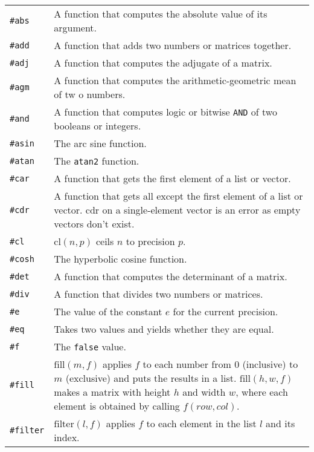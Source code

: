 \documentclass[10pt]{article}
\begin{document}
    \begin{longtable}{p{}p{}}
        \verb|#abs|     & A function that computes the absolute value of its argument. \\
        \verb|#add|     & A function that adds two numbers or matrices together. \\
        \verb|#adj|     & A function that computes the adjugate of a matrix. \\
        \verb|#agm|     & A function that computes the arithmetic-geometric mean of tw o numbers. \\
        \verb|#and|     & A function that computes logic or bitwise \verb|AND| of two booleans or integers. \\
        \verb|#asin|    & The arc sine function. \\
        \verb|#atan|    & The \verb|atan2| function. \\
        \verb|#car|     & A function that gets the first element of a list or vector. \\
        \verb|#cdr|     & A function that gets all except the first element of a list or vector.
                          $ \mathrm{cdr} $ on a single-element vector is an error as empty vectors don't exist. \\
        \verb|#cl|      & $ \mathrm{cl}(n,p) $ ceils $ n $ to precision $ p $. \\
        \verb|#cosh|    & The hyperbolic cosine function. \\
        \verb|#det|     & A function that computes the determinant of a matrix. \\
        \verb|#div|     & A function that divides two numbers or matrices. \\
        \verb|#e|       & The value of the constant $ e $ for the current precision. \\
        \verb|#eq|      & Takes two values and yields whether they are equal. \\
        \verb|#f|       & The \verb|false| value. \\
        \verb|#fill|    & $ \mathrm{fill}(m,f) $ applies $ f $ to each number from $ 0 $ (inclusive) to $ m $ (exclusive) and puts the results in a list.
                          $ \mathrm{fill}(h,w,f) $ makes a matrix with height $ h $ and width $ w $, where each element is obtained by calling $ f(row,col) $. \\
        \verb|#filter|  & $ \mathrm{filter}(l,f) $ applies $ f $ to each element in the list $ l $ and its index.

\end{longtable}
\end{document}
